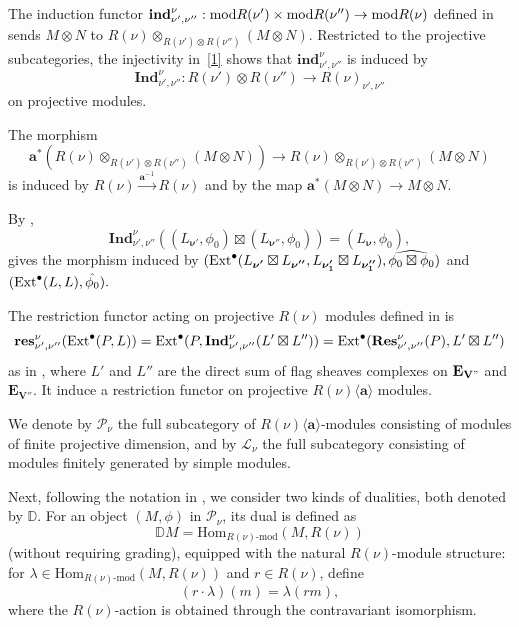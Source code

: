 \documentclass[10pt,a4paper]{amsart}
\def\Ext{\mbox{\rm Ext}}   \def\Ker{\mbox{\rm Ker}\,}
\def\mod{\mbox{\rm mod}} \def\mx{\mbox{\rm max}} \def\tr{\mbox{\rm tr}}
\def\bfV{{\mathbf V}}
\def\bfV{\mathbf{V}}
\def\bfE{\mathbf{E}}
\def\Ind{\mathbf{Ind}}
\def\Res{\mathbf{Res}}
\def\ind{\mathbf{ind}}
\def\res{\mathbf{res}}
\begin{document}
The induction functor
$\ind_{\nu',\nu''}^{\nu}: \mod R(\nu')\times \mod R(\nu'')\rightarrow \mod R(\nu)$
defined in \cite[4.1]{VaragnoloVasserot+2011+67+100} sends $M\otimes N$ to
$R(\nu)\otimes_{R(\nu')\otimes R(\nu'')}(M\otimes N)$. Restricted to the projective subcategories, the injectivity in~\eqref{1} shows that $\ind_{\nu',\nu''}^{\nu}$ is induced by 
\[
\Ind_{\nu',\nu''}^{\nu}:R(\nu')\otimes R(\nu'')\rightarrow R(\nu)_{\nu',\nu''}
\] on projective modules.

The morphism
\[
\mathbf{a}^*(R(\nu)\otimes_{R(\nu')\otimes R(\nu'')}(M\otimes N))
\rightarrow R(\nu)\otimes_{R(\nu')\otimes R(\nu'')}(M\otimes N)
\]
is induced by $R(\nu)\xrightarrow{\mathbf{a}^{-1}}R(\nu)$ and by the map $\mathbf{a}^*(M\otimes N)\rightarrow M\otimes N$.

By \cite[Lemma 12.3.2]{lusztig2010introduction},
\begin{equation}\label{eq11}
    \Ind_{\nu',\nu''}^{\nu}((L_{\boldsymbol{\nu'}},\phi_0)\boxtimes (L_{\boldsymbol{\nu''}},\phi_0))=(L_{\boldsymbol{\nu}},\phi_0),
\end{equation}
gives the morphism induced by $(\Ext^{\bullet}(L_{\boldsymbol{\nu'}}\boxtimes L_{\boldsymbol{\nu''}},L_{\boldsymbol{\nu_1'}}\boxtimes L_{\boldsymbol{\nu_1''}}),\widehat{\phi_0\boxtimes\phi_0})$ and $(\Ext^{\bullet}(L,L),\hat{\phi_0}).$

The restriction functor acting on projective $R(\nu)$ modules defined in \cite{VaragnoloVasserot+2011+67+100} is $$\res_{\nu',\nu''}^{\nu}(\Ext^{\bullet}(P,L))=\Ext^{\bullet}(P,\Ind_{\nu',\nu''}^{\nu}(L'\boxtimes L''))=\Ext^{\bullet}(\Res_{\nu',\nu''}^{\nu}(P),L'\boxtimes L'')$$ as in \cite[Definition 7.4]{Bi2024}, where $L'$ and $L''$ are the direct sum of flag sheaves complexes on $\bfE_{\bfV"}$ and $\bfE_{\bfV''}.$
It induce a restriction functor on projective $R(\nu)\langle \mathbf{a}\rangle$ modules.

We denote by $\mathcal{P}_{\nu}$ the full subcategory of $R(\nu)\langle\mathbf{a}\rangle$-modules consisting of modules of finite projective dimension, and by $\mathcal{L}_{\nu}$ the full subcategory consisting of modules finitely generated by simple modules.

Next, following the notation in \cite{https://doi.org/10.1112/jlms.12218}, we consider two kinds of dualities, both denoted by $\mathbb{D}$. For an object $(M, \phi)$ in $\mathcal{P}_{\nu}$, its dual is defined as
\[
\mathbb{D}M = \mathrm{Hom}_{R(\nu)\text{-}\mathrm{mod}}(M, R(\nu))
\]
(without requiring grading), equipped with the natural $R(\nu)$-module structure: for $\lambda\in \mathrm{Hom}_{R(\nu)\text{-}\mathrm{mod}}(M, R(\nu))$ and $r\in R(\nu)$, define
\[
(r\cdot \lambda)(m)=\lambda(rm),
\]
where the $R(\nu)$-action is obtained through the contravariant isomorphism. 
\end{document}
